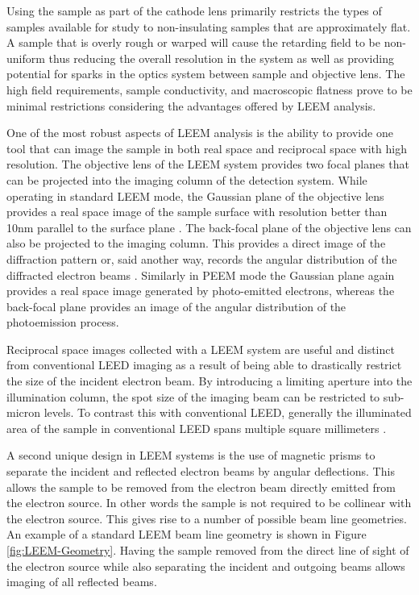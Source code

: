 Using the sample as part of the cathode lens primarily restricts the types of samples available for study to non-insulating samples that are approximately flat. A sample that is overly rough or warped will cause the retarding field to be non-uniform thus reducing the overall resolution in the system as well as providing potential for sparks in the optics system between sample and objective lens. The high field requirements, sample conductivity, and macroscopic flatness prove to be minimal restrictions considering the advantages offered by LEEM analysis.

One of the most robust aspects of LEEM analysis is the ability to provide one tool that can image the sample in both real space and reciprocal space with high resolution. The objective lens of the LEEM system provides two focal planes that can be projected into the imaging column of the detection system. While operating in standard LEEM mode, the Gaussian plane of the objective lens provides a real space image of the sample surface with resolution better than 10nm parallel to the surface plane \cite{Hannon-LEEM-Book}. The back-focal plane of the objective lens can also be projected to the imaging column. This provides a direct image of the diffraction pattern or, said another way, records the angular distribution of the diffracted electron beams \cite{Hannon-LEEM-Book}.  Similarly in PEEM mode the Gaussian plane again provides a real space image generated by photo-emitted electrons, whereas the back-focal plane provides an image of the angular distribution of the photoemission process.

Reciprocal space images collected with a LEEM system are useful and distinct from conventional LEED imaging as a result of being able to drastically restrict the size of the incident electron beam. By introducing a limiting aperture into the illumination column, the spot size of the imaging beam can be restricted to sub-micron levels. To contrast this with conventional LEED, generally the illuminated area of the sample in conventional LEED spans multiple square millimeters \cite{Hannon-LEEM-Book}.
	
A second unique design in LEEM systems is the use of magnetic prisms to separate the incident and reflected electron beams by angular deflections. This allows the sample to be removed from the electron beam directly emitted from the electron source. In other words the sample is not required to be collinear with the electron source. This gives rise to a number of possible beam line geometries. An example of a standard LEEM beam line geometry is shown in Figure \ref{fig:LEEM-Geometry}. Having the sample removed from the direct line of sight of the electron source while also separating the incident and outgoing beams allows imaging of all reflected beams. 

